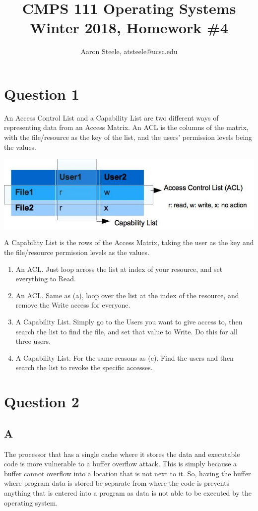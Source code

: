 \documentclass[12pt]{article}
\title{\textbf{CMPS 111 Operating Systems\\ Winter 2018, Homework \#4}}
\date{}
\author{Aaron Steele, atsteele@ucsc.edu}
\begin{document}
	
	\maketitle
	
	\section*{Question 1}
	An Access Control List and a Capability List are two different ways of representing data from an Access Matrix. An ACL is the columns of the matrix, with the file/resource as the key of the list, and the users' permission levels being the values. 
	
	\includegraphics[width=\columnwidth]{access-matrix}
	
	A Capability List is the rows of the Access Matrix, taking the user as the key and the file/resource permission levels as the values. 
	\begin{enumerate}[label=\alph*]
		\item An ACL. Just loop across the list at index of your resource, and set everything to Read.
		\item An ACL. Same as (a), loop over the list at the index of the resource, and remove the Write access for everyone.
		\item A Capability List. Simply go to the Users you want to give access to, then search the list to find the file, and set that value to Write. Do this for all three users.
		\item A Capability List. For the same reasons as (c). Find the users and then search the list to revoke the specific accesses.
	\end{enumerate}
	
	
	\section*{Question 2}
	\subsection*{A}
	The processor that has a single cache where it stores the data and executable code is more vulnerable to a buffer overflow attack. This is simply because a buffer cannot overflow into a location that is not next to it. So, having the buffer where program data is stored be separate from where the code is prevents anything that is entered into a program as data is not able to be executed by the operating system.
	
\end{document}
